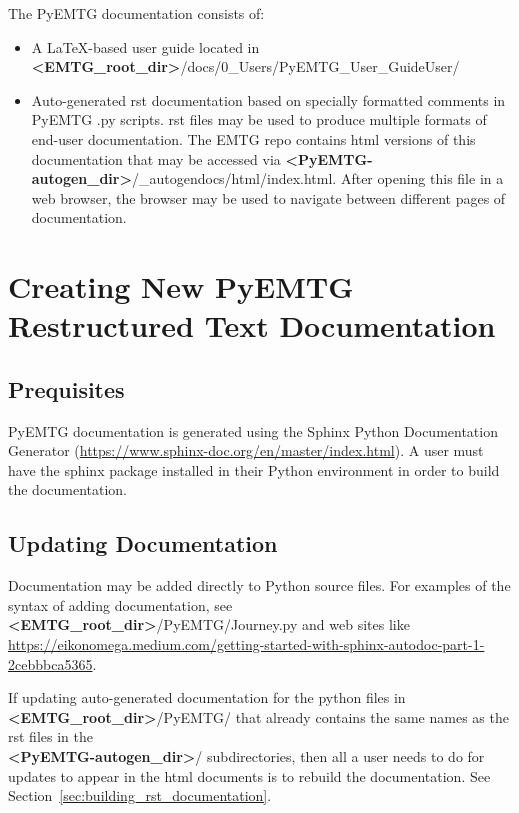 \documentclass[11pt]{article}
\begin{document}
\noindent The PyEMTG documentation consists of:
\begin{itemize}
	\item A \LaTeX-based user guide located in \textbf{\textless EMTG\_root\_dir\textgreater}/docs/0\_Users/PyEMTG\_User\_GuideUser/
	\item Auto-generated \ac{rst} documentation based on specially formatted comments in PyEMTG .py scripts. \ac{rst} files may be used to produce multiple formats of end-user documentation. The \ac{EMTG} repo contains html versions of this documentation that may be accessed via \textbf{\textless PyEMTG-autogen\_dir\textgreater}/\_autogendocs/html/index.html. After opening this file in a web browser, the browser may be used to navigate between different pages of documentation.
\end{itemize}

\section{Creating New PyEMTG Restructured Text Documentation}
\label{sec:creating_new_pyemtg_rst_documentation}

\subsection{Prequisites}
\label{sec:prequisites_for_creating_rst_docs}

PyEMTG documentation is generated using the Sphinx Python Documentation Generator (\url{https://www.sphinx-doc.org/en/master/index.html}). A user must have the sphinx package installed in their Python environment in order to build the documentation.

\subsection{Updating Documentation}
\label{sec:updating_autogen_documentation}

Documentation may be added directly to Python source files. For examples of the syntax of adding documentation, see \textbf{\textless EMTG\_root\_dir\textgreater}/PyEMTG/Journey.py and web sites like \url{https://eikonomega.medium.com/getting-started-with-sphinx-autodoc-part-1-2cebbbca5365}.

\noindent If updating auto-generated documentation for the python files in \textbf{\textless EMTG\_root\_dir\textgreater}/PyEMTG/ that already contains the same names as the rst files in the \\ \textbf{\textless PyEMTG-autogen\_dir\textgreater}/ subdirectories, then all a user needs to do for updates to appear in the html documents is to rebuild the documentation. See Section~\ref{sec:building_rst_documentation}.
\end{document}

